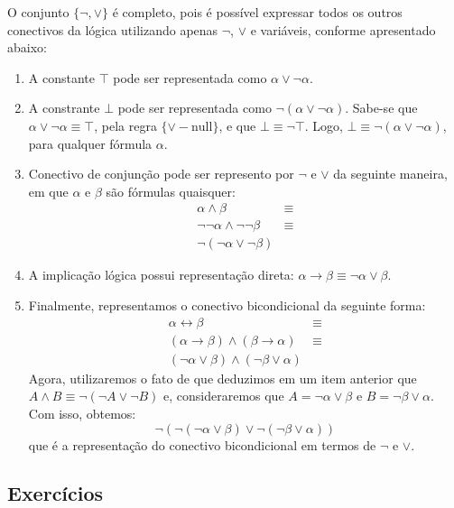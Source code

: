 \begin{Example}
O conjunto $\{\neg,\lor\}$ é completo, pois é possível expressar todos
os outros conectivos da lógica utilizando apenas $\neg$, $\lor$ e
variáveis, conforme apresentado abaixo:
\begin{enumerate}
     \item A constante $\top$ pode ser representada como $\alpha\lor\neg\alpha$.
     \item A constrante $\bot$ pode ser representada como $\neg (\alpha
       \lor \neg \alpha)$. Sabe-se que $\alpha \lor \neg \alpha\equiv \top$, pela regra
       $\{\lor-\text{null}\}$, e que $\bot \equiv \neg \top$. Logo, $\bot \equiv \neg
       (\alpha \lor \neg \alpha)$, para qualquer fórmula $\alpha$.
     \item Conectivo de conjunção pode ser represento por $\neg$ e
       $\lor$ da seguinte maneira, em que $\alpha$ e $\beta$ são
       fórmulas quaisquer:
\[
\begin{array}{lc}
  \alpha \land \beta & \equiv \\
\neg\neg \alpha \land \neg\neg \beta & \equiv \\
\neg(\neg \alpha \lor \neg \beta)
\end{array}
\]
    \item A implicação lógica possui representação direta:
      $\alpha\to\beta \equiv \neg\alpha\lor\beta$.
    \item Finalmente, representamos o conectivo bicondicional da
      seguinte forma:
\[
\begin{array}{lc}
    \alpha\leftrightarrow\beta & \equiv\\
   (\alpha \to \beta)\land (\beta \to \alpha) & \equiv \\
   (\neg \alpha \lor \beta) \land (\neg \beta\lor \alpha)
\end{array}
\]
    Agora, utilizaremos o fato de que deduzimos em um item anterior
    que  $A \land B \equiv \neg (\neg A \lor \neg B)$ e, consideraremos que
   $A = \neg\alpha \lor \beta$ e $B = \neg \beta \lor \alpha$. Com
   isso, obtemos:
\[
\neg(\neg (\neg\alpha \lor \beta)\lor \neg (\neg \beta \lor \alpha))
\]
que é a representação do conectivo bicondicional em termos de $\neg$ e $\lor$.
\end{enumerate}
\end{Example}

\subsection{Exercícios}

